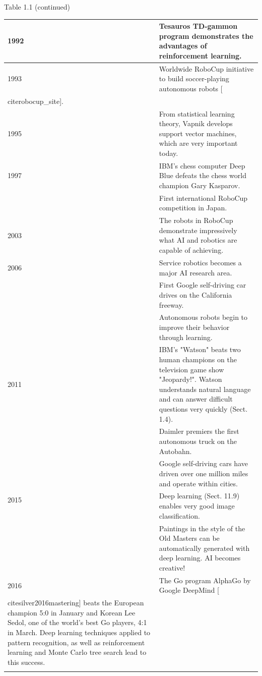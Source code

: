 \documentclass[10pt]{book}
\begin{document}
Table 1.1 (continued)


\begin{center}
\begin{tabular}{|l|l|}
\hline
1992 & Tesauros TD-gammon program demonstrates the advantages of reinforcement learning. \\
\hline
1993 & Worldwide RoboCup initiative to build soccer-playing autonomous robots [\\cite{robocup_site}]. \\
\hline
1995 & From statistical learning theory, Vapnik develops support vector machines, which are very important today. \\
\hline
1997 & IBM's chess computer Deep Blue defeats the chess world champion Gary Kasparov. \\
\hline
 & First international RoboCup competition in Japan. \\
\hline
2003 & The robots in RoboCup demonstrate impressively what AI and robotics are capable of achieving. \\
\hline
2006 & Service robotics becomes a major AI research area. \\\index{Service robotics}
\hline
2009 & First Google self-driving car drives on the California freeway. \\\index{Robot!car}\index{Self-driving car}
\hline
2010 & Autonomous robots begin to improve their behavior through learning. \\
\hline
2011 & IBM's "Watson" beats two human champions on the television game show "Jeopardy!". Watson understands natural language and can answer difficult questions very quickly (Sect. 1.4). \\
\hline
\multirow[t]{4}{*}{2015} & Daimler premiers the first autonomous truck on the Autobahn. \\
\hline
 & Google self-driving cars have driven over one million miles and operate within cities. \\
\hline
 & Deep learning (Sect. 11.9) enables very good image classification. \\
\hline
 & Paintings in the style of the Old Masters can be automatically generated with deep learning. AI becomes creative! \\
\hline
2016 & The Go program AlphaGo by Google DeepMind [\\cite{silver2016mastering}] beats the European champion 5:0 in January and Korean Lee Sedol, one of the world's best Go players, 4:1 in March. Deep learning techniques applied to pattern recognition, as well as reinforcement learning and Monte Carlo tree search lead to this success. \\\index{Automotive industry}\index{Road transportation}\index{Robot!taxi}
\hline
\end{tabular}
\end{center}
\end{document}
